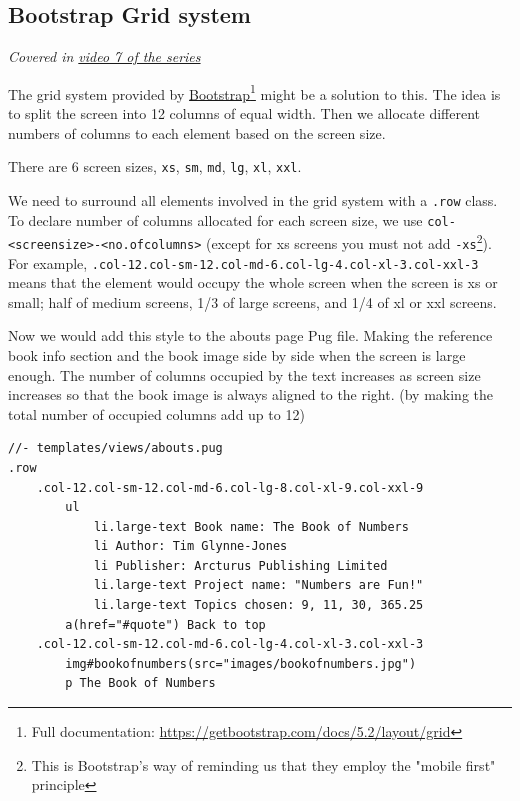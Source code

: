 \subsection{Bootstrap Grid system}
\label{sec:grid}

\textit{Covered in \href{https://www.youtube.com/watch?v=MqXHJmVtEeU&list=PLjGmdnqrOKuYXiu7lgG5HW71jPEUd1XCm&index=9}{video 7 of the series}}
\vspace{6mm}


The grid system provided by \href{https://getbootstrap.com/docs/5.2/layout/grid}{Bootstrap}\footnote{Full documentation: \url{https://getbootstrap.com/docs/5.2/layout/grid}} might be a solution to this. The idea is to split the screen into 12 columns of equal width. Then we allocate different numbers of columns to each element based on the screen size.

There are 6 screen sizes, \texttt{xs}, \texttt{sm}, \texttt{md}, \texttt{lg}, \texttt{xl}, \texttt{xxl}.

We need to surround all elements involved in the grid system with a \texttt{.row} class. To declare number of columns allocated for each screen size, we use \texttt{col-<screensize>-\hfill \break <no.ofcolumns>} (except for xs screens you must not add \texttt{-xs}\footnote{This is Bootstrap's way of reminding us that they employ the "mobile first" principle}). For example, \texttt{.col-12.col-sm-12.col-md-6.col-lg-4.col-xl-3.col-xxl-3} means that the element would occupy the whole screen when the screen is xs or small; half of medium screens, 1/3 of large screens, and 1/4 of xl or xxl screens. 

Now we would add this style to the abouts page Pug file. Making the reference book info section and the book image side by side when the screen is large enough. The number of columns occupied by the text increases as screen size increases so that the book image is always aligned to the right. (by making the total number of occupied columns add up to 12)
\vspace{6mm}

\begin{lstlisting}[language=pug]
//- templates/views/abouts.pug
.row
	.col-12.col-sm-12.col-md-6.col-lg-8.col-xl-9.col-xxl-9
		ul
			li.large-text Book name: The Book of Numbers
			li Author: Tim Glynne-Jones
			li Publisher: Arcturus Publishing Limited
			li.large-text Project name: "Numbers are Fun!"
			li.large-text Topics chosen: 9, 11, 30, 365.25
		a(href="#quote") Back to top
	.col-12.col-sm-12.col-md-6.col-lg-4.col-xl-3.col-xxl-3
		img#bookofnumbers(src="images/bookofnumbers.jpg")
		p The Book of Numbers
\end{lstlisting}

